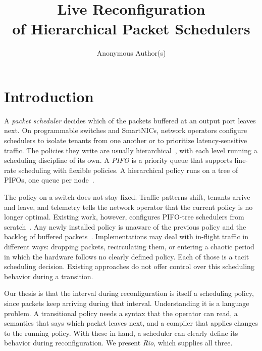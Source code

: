\documentclass[sigplan,anonymous,review,nonacm]{acmart}
\begin{document}
\title[Live Reconfiguration of Hierarchical Packet Schedulers]{Live Reconfiguration \\ of Hierarchical Packet Schedulers}

\author{Anonymous Author(s)}

\maketitle

\section{Introduction}\label{sec:intro}

A \emph{packet scheduler} decides which of the packets buffered at an output port leaves next.
On programmable switches and SmartNICs, network operators configure schedulers to isolate tenants from one another or to prioritize latency-sensitive traffic.
The policies they write are usually hierarchical~\cite{Stephens19,Kumar19,Grant20,vPIFO}, with each level running a scheduling discipline of its own.
A \emph{PIFO} is a priority queue that supports line-rate scheduling with flexible policies.
A hierarchical policy runs on a tree of PIFOs, one queue per node~\cite{Sivaraman16}.



The policy on a switch does not stay fixed.
Traffic patterns shift, tenants arrive and leave, and telemetry tells the network operator that the current policy is no longer optimal.
Existing work, however, configures PIFO-tree schedulers from scratch~\cite{Sivaraman16,Gao22,vPIFO}.
Any newly installed policy is unaware of the previous policy and the backlog of buffered packets~\cite{vPIFO,Alcoz23}.
Implementations may deal with in-flight traffic in different ways:
dropping packets, recirculating them, or entering a chaotic period in which the hardware follows no clearly defined policy.
Each of those is a tacit scheduling decision.
Existing approaches do not offer control over this scheduling behavior during a transition.

Our thesis is that the interval during reconfiguration is itself a scheduling policy, since packets keep arriving during that interval.
Understanding it is a language problem.
A transitional policy needs a syntax that the operator can read, a semantics that says which packet leaves next, and a compiler that applies changes to the running policy.
With these in hand, a scheduler can clearly define its behavior during reconfiguration.
We present \emph{Rio}, which supplies all three.
\end{document}
